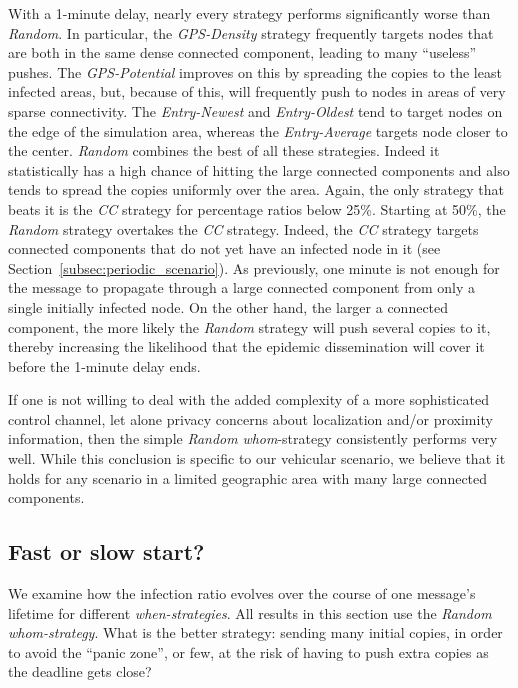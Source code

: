 \documentclass[preprint]{elsarticle}
\begin{document}
With a 1-minute delay, nearly every strategy performs significantly worse than \textit{Random}. In particular, the \textit{GPS-Density} strategy frequently targets nodes that are both in the same dense connected component, leading to many ``useless'' pushes. The \textit{GPS-Potential} improves on this by spreading the copies to the least infected areas, but, because of this, will frequently push to nodes in areas of very sparse connectivity. The \textit{Entry-Newest} and \textit{Entry-Oldest} tend to target nodes on the edge of the simulation area, whereas the \textit{Entry-Average} targets node closer to the center. \textit{Random} combines the best of all these strategies. Indeed it statistically has a high chance of hitting the large connected components and also tends to spread the copies uniformly over the area. Again, the only strategy that beats it is the \textit{CC} strategy for percentage ratios below 25\%. Starting at 50\%, the \textit{Random} strategy overtakes the \textit{CC} strategy. Indeed, the \textit{CC} strategy targets connected components that do not yet have an infected node in it (see Section~\ref{subsec:periodic_scenario}). As previously, one minute is not enough for the message to propagate through a large connected component from only a single initially infected node. On the other hand, the larger a connected component, the more likely the \textit{Random} strategy will push several copies to it, thereby increasing the likelihood that the epidemic dissemination will cover it before the 1-minute delay ends.

If one is not willing to deal with the added complexity of a more sophisticated control channel, let alone privacy concerns about localization and/or proximity information, then the simple \textit{Random} \textit{whom}-strategy consistently performs very well. While this conclusion is specific to our vehicular scenario, we believe that it holds for any scenario in a limited geographic area with many large connected components.

\subsection{Fast or slow start?}
\label{subsec:fast_slow}

We examine how the infection ratio evolves over the course of one message's lifetime for different \textit{when-strategies}. All results in this section use the \textit{Random} \textit{whom-strategy}. What is the better strategy: sending many initial copies, in order to avoid the ``panic zone'', or few, at the risk of having to push extra copies as the deadline gets close? 
\end{document}
